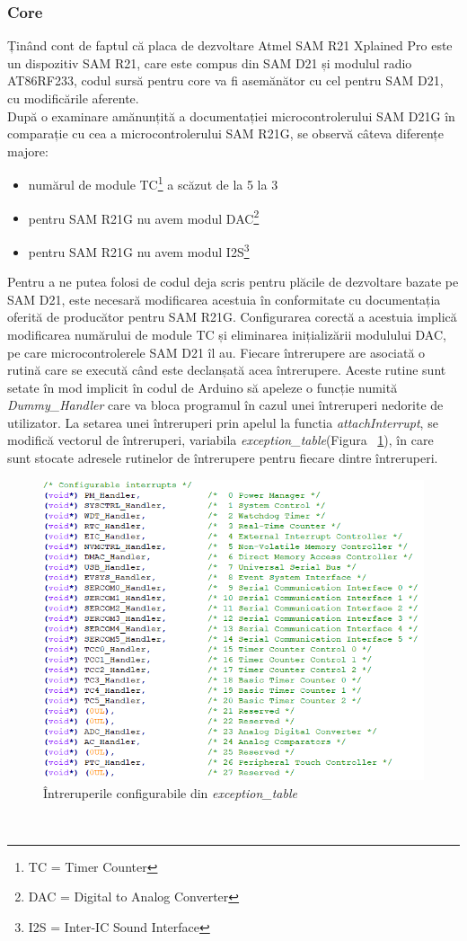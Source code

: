 \documentclass[12pt,a4paper]{report}
\begin{document}
\subsubsection{Core}
Ținând cont de faptul că placa de dezvoltare Atmel SAM R21 Xplained Pro este un dispozitiv SAM R21,  care este compus din SAM D21 și modulul radio AT86RF233, codul sursă pentru core va fi asemănător cu cel pentru SAM D21, cu modificările aferente. \\
După o examinare amănunțită a documentației microcontrolerului SAM D21G în comparație cu cea a microcontrolerului SAM R21G, se observă câteva diferențe majore:
\begin{itemize}
	\item{numărul de module TC\footnote{TC = Timer Counter} a scăzut de la 5 la 3}
	\item{pentru SAM R21G nu avem modul DAC\footnote{DAC = Digital to Analog Converter}}
	\item{pentru SAM R21G nu avem modul I2S\footnote{I2S = Inter-IC Sound Interface}}
\end{itemize}
Pentru a ne putea folosi de codul deja scris pentru plăcile de dezvoltare bazate pe SAM D21, este necesară modificarea acestuia în conformitate cu documentația oferită de producător pentru SAM R21G. Configurarea corectă a acestuia implică modificarea numărului de module TC și eliminarea inițializării modulului DAC, pe care microcontrolerele SAM D21 îl au.
Fiecare întrerupere are asociată o rutină care se execută când este declanșată acea întrerupere. Aceste rutine sunt setate în mod implicit în codul de Arduino să apeleze o funcție numită \textit{Dummy\_Handler} care va bloca programul în cazul unei întreruperi nedorite de utilizator. La setarea unei întreruperi prin apelul la functia \textit{attachInterrupt}, se modifică vectorul de întreruperi, variabila \textit{exception\_table}(Figura ~\ref{fig:interrupts}), în care sunt stocate adresele rutinelor de întrerupere pentru fiecare dintre întreruperi. 
\begin{figure}[h]
\centering
\includegraphics[scale=0.6]{pics/interrupt_vector.png}
  \caption{Întreruperile configurabile din \textit{exception\_table}}
  \label{fig:interrupts}
\end{figure}\\
\end{document}
